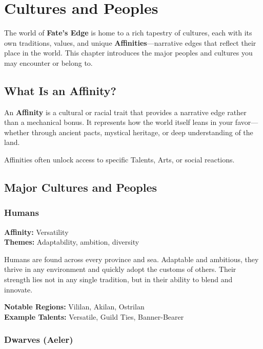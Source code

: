 
\chapter{Cultures and Peoples}

The world of \textbf{Fate’s Edge} is home to a rich tapestry of cultures, each with its own traditions, values, and unique \textbf{Affinities}—narrative edges that reflect their place in the world. This chapter introduces the major peoples and cultures you may encounter or belong to.

\section{What Is an Affinity?}

An \textbf{Affinity} is a cultural or racial trait that provides a narrative edge rather than a mechanical bonus. It represents how the world itself leans in your favor—whether through ancient pacts, mystical heritage, or deep understanding of the land.

Affinities often unlock access to specific Talents, Arts, or social reactions.

\section{Major Cultures and Peoples}

\subsection*{Humans}

\textbf{Affinity:} Versatility \\
\textbf{Themes:} Adaptability, ambition, diversity

Humans are found across every province and sea. Adaptable and ambitious, they thrive in any environment and quickly adopt the customs of others. Their strength lies not in any single tradition, but in their ability to blend and innovate.

\textbf{Notable Regions:} Vililan, Akilan, Ostrilan \\
\textbf{Example Talents:} Versatile, Guild Ties, Banner-Bearer

\subsection*{Dwarves (Aeler)}

